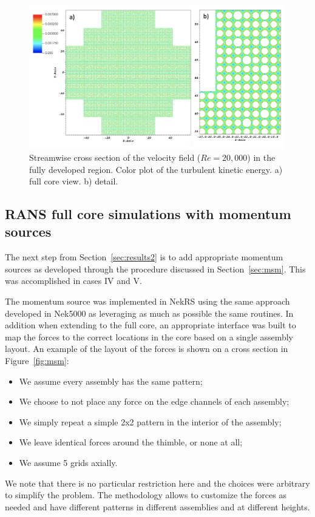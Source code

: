 \begin{figure}[!ht]
\centering
\includegraphics[width=0.99\textwidth]{./figures/periodic_tke.png}
\caption{Streamwise cross section of the velocity field ($Re=20,000$) in the fully developed region. Color plot of the turbulent kinetic energy. a) full core view. b) detail. }
\label{fig:tke}
\end{figure}

\subsection{RANS full core simulations with momentum sources}
\label{sec:results3}

The next step from Section~\ref{sec:results2} is to add appropriate momentum sources as developed through the procedure discussed in Section~\ref{sec:msm}. This was accomplished in cases IV and V.

 The momentum source was implemented in NekRS using the same approach developed in Nek5000 as leveraging as much as possible the same routines. In addition when extending to the full core, an appropriate interface was built to map the forces to the correct locations in the core based on a single assembly layout. An example of the layout of the forces is shown on a cross section in Figure~\ref{fig:msm}:
\begin{itemize}
    \item We assume every assembly has the same pattern;
    \item We choose to not place any force on the edge channels of each assembly;
    \item We simply repeat a simple 2x2 pattern in the interior of the assembly;
    \item We leave identical forces around the thimble, or none at all;
    \item We assume 5 grids axially.
\end{itemize}
We note that there is no particular restriction here and the choices were arbitrary to simplify the problem. The methodology allows to customize the forces as needed and have different patterns in different assemblies and at different heights.

